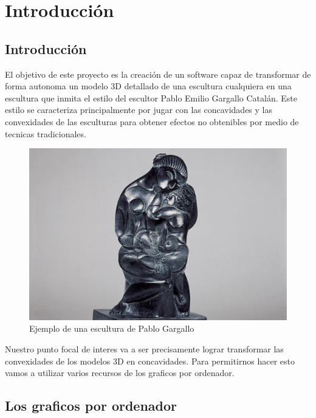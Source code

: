 \chapter{Introducción}

\section{Introducción}
El objetivo de este proyecto es la creación de un software capaz de transformar de forma autonoma un modelo 3D detallado de una escultura cualquiera en una escultura que inmita el estilo del escultor Pablo Emilio Gargallo Catalán.
Este estilo se caracteriza principalmente por jugar con las concavidades y las convexidades de las esculturas para obtener efectos no obtenibles por medio de tecnicas tradicionales.

\begin{figure}
    \centering
    \includegraphics[width=\textwidth]{imagenes/maternidad_gargallo.jpg}
    \caption{Ejemplo de una escultura de Pablo Gargallo}
\end{figure}


Nuestro punto focal de interes va a ser precisamente lograr transformar las convexidades de los modelos 3D en concavidades. Para permitirnos hacer esto vamos a utilizar varios recursos de los graficos por ordenador.

\section{Los graficos por ordenador}
